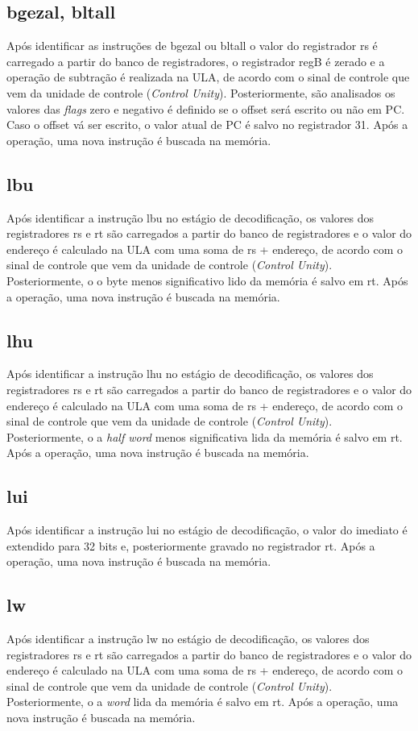 \documentclass{article}
\begin{document}
    \subsection{bgezal, bltall}
    Após identificar as instruções de bgezal ou bltall o valor do registrador rs é carregado a partir do banco de registradores, o registrador regB é zerado e a operação de subtração é realizada na ULA, de acordo com o sinal de controle que vem da unidade de controle ({\it Control Unity}). Posteriormente, são analisados os valores das {\it flags} zero e negativo é definido se o offset será escrito ou não em PC. Caso o offset vá ser escrito, o valor atual de PC é salvo no registrador 31. Após a operação, uma nova instrução é buscada na memória.
    \\
    \subsection{lbu}
    Após identificar a instrução lbu no estágio de decodificação, os valores dos registradores rs e rt são carregados a partir do banco de registradores e o valor do endereço é calculado na ULA com uma soma de rs + endereço, de acordo com o sinal de controle que vem da unidade de controle ({\it Control Unity}). Posteriormente, o o byte menos significativo lido da memória é salvo em rt. Após a operação, uma nova instrução é buscada na memória.
    \\
    \subsection{lhu}
    Após identificar a instrução lhu no estágio de decodificação, os valores dos registradores rs e rt são carregados a partir do banco de registradores e o valor do endereço é calculado na ULA com uma soma de rs + endereço, de acordo com o sinal de controle que vem da unidade de controle ({\it Control Unity}). Posteriormente, o a {\it half word} menos significativa lida da memória é salvo em rt. Após a operação, uma nova instrução é buscada na memória.
    \\
    \subsection{lui}
    Após identificar a instrução lui no estágio de decodificação, o valor do imediato é extendido para 32 bits e, posteriormente gravado no registrador rt. Após a operação, uma nova instrução é buscada na memória.
    \\
    \subsection{lw}
    Após identificar a instrução lw no estágio de decodificação, os valores dos registradores rs e rt são carregados a partir do banco de registradores e o valor do endereço é calculado na ULA com uma soma de rs + endereço, de acordo com o sinal de controle que vem da unidade de controle ({\it Control Unity}). Posteriormente, o a {\it word} lida da memória é salvo em rt. Após a operação, uma nova instrução é buscada na memória.
    \\
\end{document}
